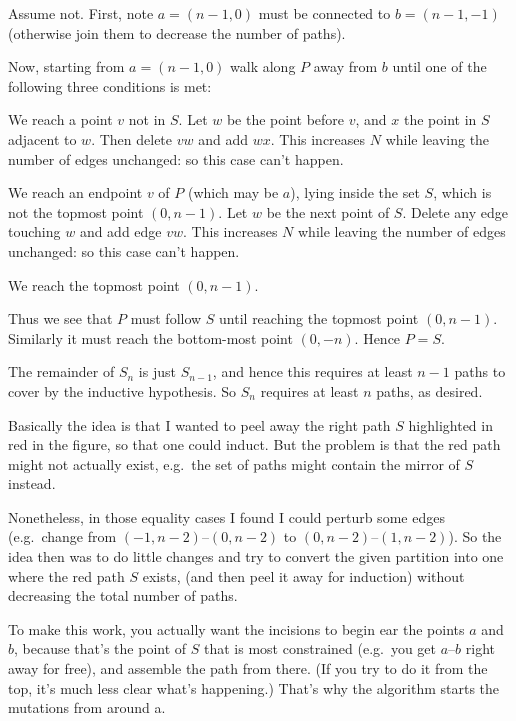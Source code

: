 \documentclass[11pt]{scrartcl}
\begin{document}
Assume not.
First, note $a = (n-1,0)$ must be connected to $b = (n-1, -1)$
(otherwise join them to decrease the number of paths).

Now, starting from $a = (n-1,0)$ walk along $P$ away from $b$
until one of the following three conditions is met:
\begin{itemize}
  \ii We reach a point $v$ not in $S$.
  Let $w$ be the point before $v$,
  and $x$ the point in $S$ adjacent to $w$.
  Then delete $vw$ and add $wx$.
  This increases $N$ while leaving the number of edges unchanged:
  so this case can't happen.

  \ii We reach an endpoint $v$ of $P$ (which may be $a$),
  lying inside the set $S$, which is not the topmost point $(0,n-1)$.
  Let $w$ be the next point of $S$.
  Delete any edge touching $w$ and add edge $vw$.
  This increases $N$ while leaving the number of edges unchanged:
  so this case can't happen.

  \ii We reach the topmost point $(0,n-1)$.
\end{itemize}
Thus we see that $P$ must follow $S$ until reaching the topmost point $(0,n-1)$.
Similarly it must reach the bottom-most point $(0,-n)$.
Hence $P=S$.

The remainder of $S_n$ is just $S_{n-1}$,
and hence this requires at least $n-1$ paths to
cover by the inductive hypothesis.
So $S_n$ requires at least $n$ paths, as desired.


\begin{remark*}
  Basically the idea is that I wanted to peel away the
  right path $S$ highlighted in red in the figure, so that one could induct.
  But the problem is that the red path might not actually exist,
  e.g.\ the set of paths might contain the mirror of $S$ instead.

  Nonetheless, in those equality cases I found I could perturb some edges
  (e.g.\ change from $(-1,n-2)$--$(0,n-2)$ to $(0,n-2)$--$(1,n-2)$).
  So the idea then was to do little changes and try to convert
  the given partition into one where the red path $S$ exists,
  (and then peel it away for induction)
  without decreasing the total number of paths.

  To make this work, you actually want the incisions to begin
  ear the points $a$ and $b$,
  because that's the point of $S$ that is most constrained
  (e.g.\ you get $a$--$b$ right away for free),
  and assemble the path from there.
  (If you try to do it from the top, it's much less clear what's happening.)
  That's why the algorithm starts the mutations from around a.
\end{remark*}
\end{document}
